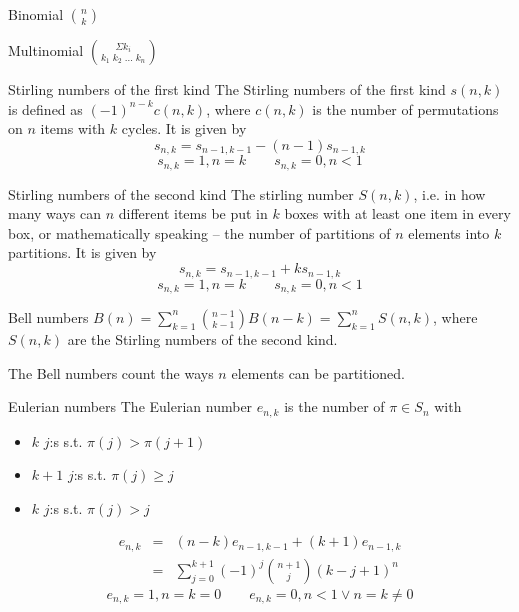 

\begin{algorithm}{Binomial $\binom{n}{k}$}
\end{algorithm}

\begin{algorithm}{Multinomial $\binom{\Sigma k_i}{k_1\;k_2\;\ldots\;k_n}$}
\end{algorithm}

\begin{algorithm}{Stirling numbers of the first kind}
\desc
The Stirling numbers of the first kind $s(n,k)$ is defined as
$(-1)^{n-k}c(n,k)$, where $c(n,k)$ is the number of permutations on
$n$ items with $k$ cycles. It is given by
$$s_{n,k} = s_{n-1,k-1} - (n-1)s_{n-1,k}$$
$$s_{n,k} = 1, n = k \qquad s_{n,k} = 0, n < 1$$
\end{algorithm}

\begin{algorithm}{Stirling numbers of the second kind}
\desc
The stirling number $S(n,k)$, i.e. in how many ways can $n$
different items be put in $k$ boxes with at least one item in every
box, or mathematically speaking -- the number of partitions of $n$
elements into $k$ partitions. It is given by
$$s_{n,k} = s_{n-1,k-1} + ks_{n-1,k}$$
$$s_{n,k} = 1, n = k \qquad s_{n,k} = 0, n < 1$$
\end{algorithm}

\begin{algorithm}{Bell numbers}
\desc
$B(n) = \sum_{k=1}^n \binom{n-1}{k-1} B(n-k) = \sum_{k=1}^n S(n,k)$,
where $S(n, k)$ are the Stirling numbers of the second kind.

The Bell numbers count the ways $n$ elements can be partitioned.
\end{algorithm}

\begin{algorithm}{Eulerian numbers}
\desc
The Eulerian number $e_{n,k}$ is the number of $\pi \in S_n$ with
\begin{itemize}
\item $k$ $j$:s s.t. $\pi(j) > \pi(j+1)$
\item $k+1$ $j$:s s.t. $\pi(j) \ge j$
\item $k$ $j$:s s.t. $\pi(j) > j$
\end{itemize}
\begin{eqnarray*}
e_{n,k} & = & (n-k)e_{n-1,k-1} + (k+1) e_{n-1, k}\\
        & = & \sum_{j=0}^{k+1}(-1)^j \binom{n+1}{j} (k - j + 1)^n
\end{eqnarray*}
$$e_{n,k} = 1, n = k = 0 \qquad e_{n,k} = 0, n < 1 \vee n = k \ne 0$$
\end{algorithm}

